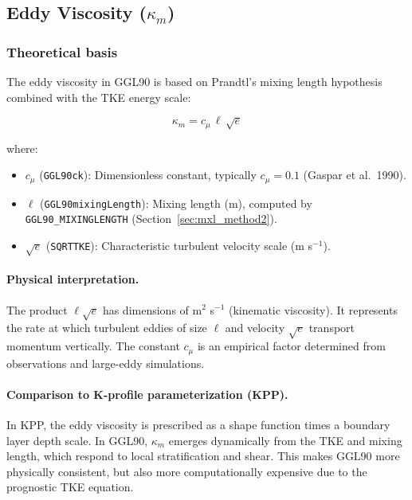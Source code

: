 \documentclass[12pt,letterpaper]{article}
\begin{document}
\subsection{Eddy Viscosity ($\kappa_m$)}
\label{sec:eddy_visc}

\subsubsection{Theoretical basis}

The eddy viscosity in GGL90 is based on Prandtl's mixing length hypothesis combined with the TKE energy scale:

\begin{equation}
\kappa_m = c_\mu \, \ell \, \sqrt{e}
\label{eq:kappa_m}
\end{equation}

where:
\begin{itemize}
\item $c_\mu$ (\verb|GGL90ck|): Dimensionless constant, typically $c_\mu = 0.1$ (Gaspar et al.\ 1990).
\item $\ell$ (\verb|GGL90mixingLength|): Mixing length (m), computed by \verb|GGL90_MIXINGLENGTH| (Section~\ref{sec:mxl_method2}).
\item $\sqrt{e}$ (\verb|SQRTTKE|): Characteristic turbulent velocity scale (m s$^{-1}$).
\end{itemize}

\paragraph{Physical interpretation.} The product $\ell \sqrt{e}$ has dimensions of m$^2$ s$^{-1}$ (kinematic viscosity). It represents the rate at which turbulent eddies of size $\ell$ and velocity $\sqrt{e}$ transport momentum vertically. The constant $c_\mu$ is an empirical factor determined from observations and large-eddy simulations.

\paragraph{Comparison to K-profile parameterization (KPP).} In KPP, the eddy viscosity is prescribed as a shape function times a boundary layer depth scale. In GGL90, $\kappa_m$ emerges dynamically from the TKE and mixing length, which respond to local stratification and shear. This makes GGL90 more physically consistent, but also more computationally expensive due to the prognostic TKE equation.
\end{document}
